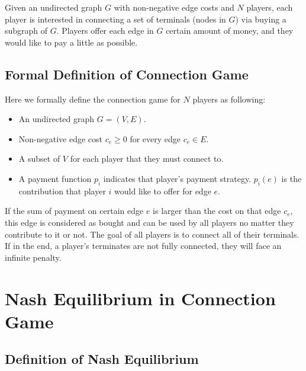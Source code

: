 \documentclass[11pt,psfig,times]{article}
\begin{document}
Given an undirected graph \(G\) with non-negative edge costs and \(N\) players, each player is interested in connecting a set of terminals (nodes in \(G\)) via buying a subgraph of \(G\). Players offer each edge in \(G\) certain amount of money, and they would like to pay a little as possible. 

\subsection{Formal Definition of Connection Game}
Here we formally define the connection game for \(N\) players as following:
\begin{itemize}
	\item An undirected graph \(G = (V,E)\).
	\item Non-negative edge cost \(c_e \geq 0\) for every edge $c_e \in E$.
	\item A subset of \(V\) for each player that they must connect to. 
	\item A payment function \(p_i\) indicates that player's payment strategy. \(p_i(e)\) is the contribution that player \(i\) would like to offer for edge \(e\).
\end{itemize}

If the sum of payment on certain edge \(e\) is larger than the cost on that edge \(c_e\), this edge is considered as bought and can be used by all players no matter they contribute to it or not. The goal of all players is to connect all of their terminals. If in the end, a player's terminates are not fully connected, they will face an infinite penalty.  

\section{Nash Equilibrium in Connection Game}
\subsection{Definition of Nash Equilibrium}
\end{document}
